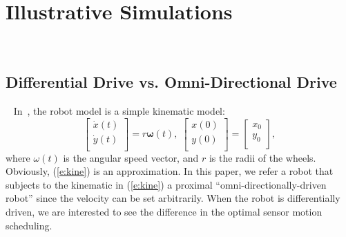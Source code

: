 \section{Illustrative Simulations}~\label{s:exp}

\subsection{Differential Drive vs. Omni-Directional Drive}~\label{s:DDvsOD}
    In~\cite{UcinskiOptDPS05}, the robot model is a simple kinematic model:
\begin{equation}\label{e:kine}
    \begin{bmatrix}
    \dot x(t) \\
    \dot y(t) \\
    \end{bmatrix}
    =
    r\mathbf{\omega}(t), \;
%
    \begin{bmatrix}
    x(0) \\
    y(0) \\
    \end{bmatrix}
    =
    \begin{bmatrix}
    x_0 \\
    y_0 \\
    \end{bmatrix},
\end{equation}
where $\omega(t)$ is the angular speed vector, and $r$ is the radii of the wheels.
Obviously, (\ref{e:kine}) is an approximation.
    In this paper, we refer a robot that subjects to the kinematic in (\ref{e:kine}) a  proximal ``omni-directionally-driven robot'' since the velocity can be set arbitrarily. When the robot is differentially driven, we are interested  to see the difference in the optimal sensor motion scheduling.
